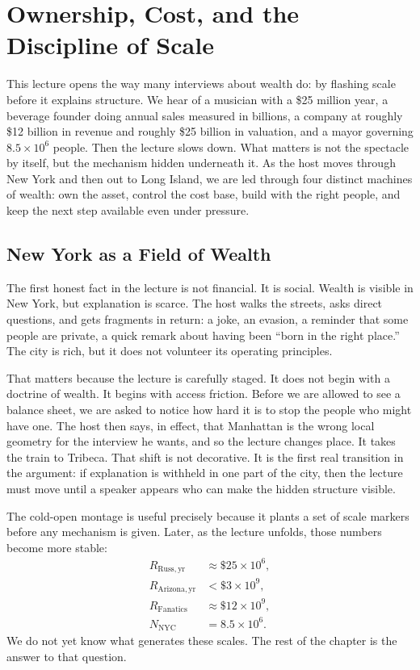 \chapter{Ownership, Cost, and the Discipline of Scale}

This lecture opens the way many interviews about wealth do: by flashing scale before it explains structure. We hear of a musician with a \$25 million year, a beverage founder doing annual sales measured in billions, a company at roughly \$12 billion in revenue and roughly \$25 billion in valuation, and a mayor governing \(8.5\times 10^6\) people. Then the lecture slows down. What matters is not the spectacle by itself, but the mechanism hidden underneath it. As the host moves through New York and then out to Long Island, we are led through four distinct machines of wealth: own the asset, control the cost base, build with the right people, and keep the next step available even under pressure.

\section{New York as a Field of Wealth}

The first honest fact in the lecture is not financial. It is social. Wealth is visible in New York, but explanation is scarce. The host walks the streets, asks direct questions, and gets fragments in return: a joke, an evasion, a reminder that some people are private, a quick remark about having been ``born in the right place.'' The city is rich, but it does not volunteer its operating principles.

That matters because the lecture is carefully staged. It does not begin with a doctrine of wealth. It begins with access friction. Before we are allowed to see a balance sheet, we are asked to notice how hard it is to stop the people who might have one. The host then says, in effect, that Manhattan is the wrong local geometry for the interview he wants, and so the lecture changes place. It takes the train to Tribeca. That shift is not decorative. It is the first real transition in the argument: if explanation is withheld in one part of the city, then the lecture must move until a speaker appears who can make the hidden structure visible.

The cold-open montage is useful precisely because it plants a set of scale markers before any mechanism is given. Later, as the lecture unfolds, those numbers become more stable:
\begin{align}
R_{\mathrm{Russ,yr}} &\approx \$25\times 10^6,\\
R_{\mathrm{Arizona,yr}} &< \$3\times 10^9,\\
R_{\mathrm{Fanatics}} &\approx \$12\times 10^9,\\
N_{\mathrm{NYC}} &= 8.5\times 10^6.
\end{align}
We do not yet know what generates these scales. The rest of the chapter is the answer to that question.

